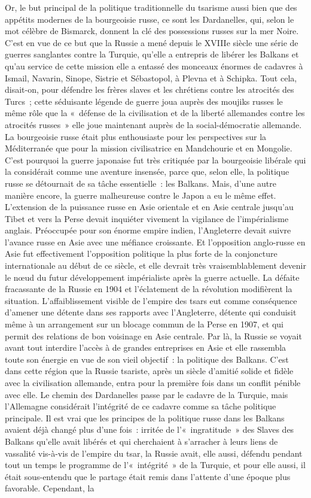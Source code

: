 \documentclass[french,twoside]{book} %
\begin{document}
Or, le but principal de la politique traditionnelle du tsarisme aussi bien que des appétits modernes de la bourgeoisie russe, ce sont les Dardanelles, qui, selon le mot célèbre de Bismarck, donnent la clé des possessions russes sur la mer Noire. C'est en vue de ce but que la Russie a mené depuis le XVIIIe siècle une série de guerres sanglantes contre la Turquie, qu’elle a entrepris de libérer les Balkans et qu’au service de cette mission elle a entassé des monceaux énormes de cadavres à Ismail, Navarin, Sinope, Sistrie et Sébastopol, à Plevna et à Schipka. Tout cela, disait-on, pour défendre les frères slaves et les chrétiens contre les atrocités des Turcs ; cette séduisante légende de guerre joua auprès des moujiks russes le même rôle  que la « défense de la civilisation et de la liberté allemandes contre les atrocités russes » elle joue maintenant auprès de la social-démocratie allemande. La bourgeoisie russe était plus enthousiaste pour les perspectives sur la Méditerranée que pour la mission civilisatrice en Mandchourie et en Mongolie. C'est pourquoi la guerre japonaise fut très critiquée par la bourgeoisie libérale qui la considérait comme une aventure insensée, parce que, selon elle, la politique russe se détournait de sa tâche essentielle : les Balkans. Mais, d’une autre manière encore, la guerre malheureuse contre le Japon a eu le même effet. L'extension de la puissance russe en Asie orientale et en Asie centrale jusqu’au Tibet et vers la Perse devait inquiéter vivement la vigilance de l’impérialisme anglais. Préoccupée pour son énorme empire indien, l’Angleterre devait suivre l’avance russe en Asie avec une méfiance croissante. Et l’opposition anglo-russe en Asie fut effectivement l’opposition politique la plus forte de la conjoncture internationale au début de ce siècle, et elle devrait très vraisemblablement devenir le nœud du futur développement impérialiste après la guerre actuelle. La défaite fracassante de la Russie en 1904 et l’éclatement de la révolution modifièrent la situation. L'affaiblissement visible de l’empire des tsars eut comme conséquence d’amener une détente dans ses rapports avec l’Angleterre, détente qui conduisit même à un arrangement sur un blocage commun de la Perse en 1907, et qui permit des relations de bon voisinage en Asie centrale. Par là, la Russie se voyait avant tout interdire l’accès à de grandes entreprises en Asie et elle rassembla toute son énergie en vue de son vieil objectif : la politique des Balkans. C'est dans cette région que la Russie tsariste, après un siècle d’amitié solide et fidèle avec la civilisation allemande, entra pour la première fois dans un conflit pénible avec elle. Le chemin des Dardanelles passe par le cadavre de la Turquie, mais l’Allemagne considérait l’intégrité de ce cadavre comme sa tâche politique principale. Il est vrai que les principes de la politique russe dans les Balkans avaient déjà changé plus d’une fois : irritée de l’« ingratitude » des Slaves des Balkans qu’elle avait libérés et qui cherchaient à s’arracher à leurs liens de vassalité vis-à-vis de l’empire du tsar, la Russie avait, elle aussi, défendu pendant tout un temps le programme de l’« intégrité » de la Turquie, et pour elle aussi, il était sous-entendu que le partage était remis dans l’attente d’une époque plus favorable. Cependant, la 
\end{document}
